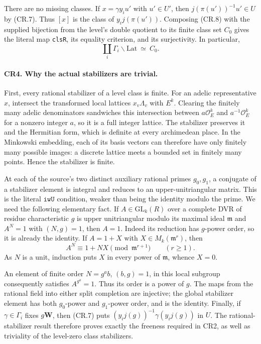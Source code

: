 \documentclass[11pt,a4paper]{article}
\numberwithin{equation}{section}
\theoremstyle{remark}\newtheorem{remark}[theorem]{Remark}
\begin{document}
There are no missing classes. If $x=\gamma y_i u'$ with $u'\in U'$,
then $j(\pi(u'))^{-1}u'\in U$ by (CR.7). Thus $[x]$ is the class
of $y_i j(\pi(u'))$. Composing (CR.8) with the supplied bijection
from the level's double quotient to its finite class set $C_0$ gives
the literal map \texttt{clsR}, its equality criterion, and its
surjectivity. In particular,
\[
 \coprod_i\Gamma_i\backslash\mathrm{Lat}\ \simeq\ C_0.
                                                               \tag{CR.10}
\]

\paragraph{CR4. Why the actual stabilizers are trivial.}
First, every rational stabilizer of a level class is finite.
For an adelic representative $x$, intersect the transformed local
lattices $x_v\Lambda_v$ with $E^k$. Clearing the finitely many adelic
denominators sandwiches this intersection between
$a\mathcal O_E^k$ and $a^{-1}\mathcal O_E^k$ for a nonzero integer
$a$, so it is a full integer lattice. The stabilizer preserves it
and the Hermitian form, which is definite at every archimedean place.
In the Minkowski embedding, each of its basis vectors can therefore
have only finitely many possible images: a discrete lattice meets
a bounded set in finitely many points. Hence the stabilizer is finite.

At each of the source's two distinct auxiliary rational primes
$g_0,g_1$, a conjugate of a stabilizer element is integral and reduces
to an upper-unitriangular matrix. This is the literal
$\texttt{iwU}$ condition, weaker than being the identity modulo the
prime. We need the following elementary fact. If $A\in\mathrm{GL}_k(R)$
over a complete DVR of residue characteristic $g$ is upper
unitriangular modulo its maximal ideal $\mathfrak m$ and
$A^N=1$ with $(N,g)=1$, then $A=1$. Indeed its reduction has
$g$-power order, so it is already the identity. If
$A=1+X$ with $X\in M_k(\mathfrak m^r)$, then
\[
 A^N\equiv1+NX\pmod{\mathfrak m^{r+1}}
       \qquad(r\ge1).
\]
As $N$ is a unit, induction puts $X$ in every power of
$\mathfrak m$, whence $X=0$.

An element of finite order $N=g^a b$, $(b,g)=1$, in this local
subgroup consequently satisfies $A^{g^a}=1$. Thus its order is a
power of $g$. The maps from the rational field into either split
completion are injective; the global stabilizer element has both
$g_0$-power and $g_1$-power order, and is the identity.
Finally, if $\gamma\in\Gamma_i$ fixes $g\mathbf W$, then (CR.7)
puts $(y_i j(g))^{-1}\gamma(y_i j(g))$ in $U$.
The rational-stabilizer result therefore proves exactly the freeness
required in CR2, as well as triviality of the level-zero class
stabilizers.
\end{document}
